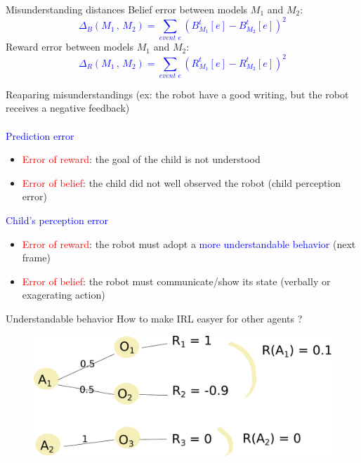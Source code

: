 \documentclass[compress]{beamer}
\begin{document}
\begin{frame}{Misunderstanding distances}
Belief error between models $M_1$ and $M_2$:
\LARGE
\textcolor{blue}{$$ \Delta_B(M_1\, ,\, M_2) = \sum \limits_{event\,\, e} (B^t_{M_1}[e] - B^t_{M_2}[e])^2 $$}
\normalsize
Reward error between models $M_1$ and $M_2$:
\LARGE
\textcolor{blue}{$$ \Delta_R(M_1\, ,\, M_2) = \sum \limits_{event\,\, e} (R^t_{M_1}[e] - R^t_{M_2}[e])^2 $$}
\end{frame}


\begin{frame}{Reaparing misunderstandings}
(ex: the robot have a good writing, but the robot receives a negative feedback)\\
\\
\textcolor{blue}{Prediction error}
\begin{itemize}
\item \textcolor{red}{Error of reward}: the goal of the child is not understood
\item \textcolor{red}{Error of belief}: the child did not well observed the robot (child perception error)
\end{itemize}
\textcolor{blue}{Child's perception error}
\begin{itemize}
\item \textcolor{red}{Error of reward}: the robot must adopt a \textcolor{blue}{more understandable behavior} (next frame)
\item \textcolor{red}{Error of belief}: the robot must communicate/show its state (verbally or exagerating action)
\end{itemize}
\end{frame}

\begin{frame}{Understandable behavior}
How to make IRL easyer for other agents ?
\begin{figure}
\includegraphics[width=.9\columnwidth]{helpIRL}
\end{figure}
\end{frame}
\end{document}
